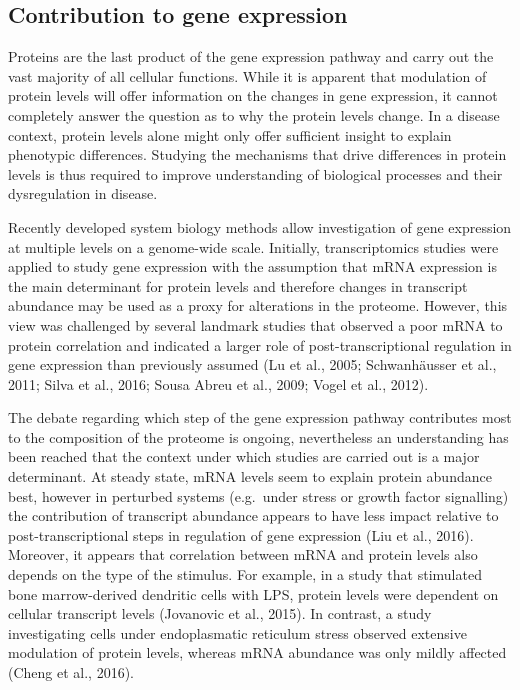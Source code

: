 \documentclass[
  12pt,
  openany]{book}
\begin{document}
\subsection{Contribution to gene expression}

Proteins are the last product of the gene expression pathway and carry out the vast majority of all cellular functions. While it is apparent that modulation of protein levels will offer information on the changes in gene expression, it cannot completely answer the question as to why the protein levels change. In a disease context, protein levels alone might only offer sufficient insight to explain phenotypic differences. Studying the mechanisms that drive differences in protein levels is thus required to improve understanding of biological processes and their dysregulation in disease.

Recently developed system biology methods allow investigation of gene expression at multiple levels on a genome-wide scale. Initially, transcriptomics studies were applied to study gene expression with the assumption that mRNA expression is the main determinant for protein levels and therefore changes in transcript abundance may be used as a proxy for alterations in the proteome. However, this view was challenged by several landmark studies that observed a poor mRNA to protein correlation and indicated a larger role of post-transcriptional regulation in gene expression than previously assumed (Lu et al., 2005; Schwanhäusser et al., 2011; Silva et al., 2016; Sousa Abreu et al., 2009; Vogel et al., 2012).

The debate regarding which step of the gene expression pathway contributes most to the composition of the proteome is ongoing, nevertheless an understanding has been reached that the context under which studies are carried out is a major determinant. At steady state, mRNA levels seem to explain protein abundance best, however in perturbed systems (e.g.~under stress or growth factor signalling) the contribution of transcript abundance appears to have less impact relative to post-transcriptional steps in regulation of gene expression (Liu et al., 2016). Moreover, it appears that correlation between mRNA and protein levels also depends on the type of the stimulus. For example, in a study that stimulated bone marrow-derived dendritic cells with LPS, protein levels were dependent on cellular transcript levels (Jovanovic et al., 2015). In contrast, a study investigating cells under endoplasmatic reticulum stress observed extensive modulation of protein levels, whereas mRNA abundance was only mildly affected (Cheng et al., 2016).
\end{document}
